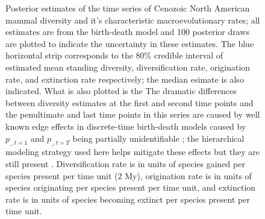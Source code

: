 \documentclass[12pt,letterpaper]{article}
\begin{document}
\begin{figure}[ht]
  \caption[Estimated mammal log-diversity and macroevolutionary rates for the Cenozoic]{Posterior estimates of the time series of Cenozoic North American mammal diversity and it's characteristic macroevolutionary rates; all estimates are from the birth-death model and 100 posterior draws are plotted to indicate the uncertainty in these estimates. The blue horizontal strip corresponds to the 80\% credible interval of estimated mean standing diversity, diversification rate, origination rate, and extinction rate respectively; the median esimate is also indicated. What is also plotted is the  The dramatic differences between diversity estimates at the first and second time points and the penultimate and last time points in this series are caused by well known edge effects in discrete-time birth-death models caused by \(p_{\_, t = 1}\) and \(p_{\_, t = T}\) being partially unidentifiable \citep{Royle2008}; the hierarchical modeling strategy used here helps mitigate these effects but they are still present \citep{Gelman2013d,Royle2008}. Diversification rate is in units of species gained per species present per time unit (2 My), origination rate is in units of species originating per species present per time unit, and extinction rate is in units of species becoming extinct per species present per time unit.}
  \label{fig:macro_values}
\end{figure}
\end{document}
